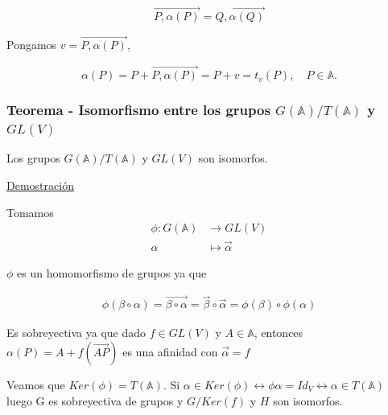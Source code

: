 \documentclass[12pt, a4paper, ones, notitlepage, openany,titlepage]{article}
\newcommand{\demostracion}{\noindent\underline{Demostración}}
\begin{document}
$$
\overrightarrow{P, \alpha(P)}=\overrightarrow{Q, \alpha(Q)}
$$

Pongamos $v=\overrightarrow{P, \alpha(P)}$,

$$
\alpha(P)=P+\overrightarrow{P, \alpha(P)}=P+v=t_{v}(P), \quad P \in \mathbb{A} .
$$

\subsubsection{Teorema - Isomorfismo entre los grupos $G(\mathbb{A}) / T(\mathbb{A})$ y $G L(V)$}
Los grupos $G(\mathbb{A}) / T(\mathbb{A})$ y $G L(V)$ son isomorfos.

\demostracion

Tomamos
$$
\begin{aligned}
\phi: G(\mathbb{A}) & \longrightarrow G L(V) \\
\alpha & \longmapsto \vec{\alpha}
\end{aligned}
$$

$\phi$ es un homomorfismo de grupos ya que

$$
\begin{aligned}
	\phi(\beta\circ\alpha)=\overrightarrow{\beta\circ\alpha}=\vec{\beta}\circ\vec{\alpha}=\phi(\beta)\circ\phi(\alpha)
\end{aligned}
$$

Es sobreyectiva ya que dado $f\in GL(V)$ y $A\in\mathbb{A}$, entonces $\alpha(P) = A + f(\overrightarrow{AP})$ es una afinidad con $\vec{\alpha}=f$

Veamos que $Ker(\phi)=T(\mathbb{A})$. Si $\alpha\in Ker(\phi) \longleftrightarrow \phi{\alpha} = Id_{V} \longleftrightarrow \alpha\in T(\mathbb{A})$ luego G es sobreyectiva de grupos y $G/Ker(f)$ y $H$ son isomorfos.
\end{document}
